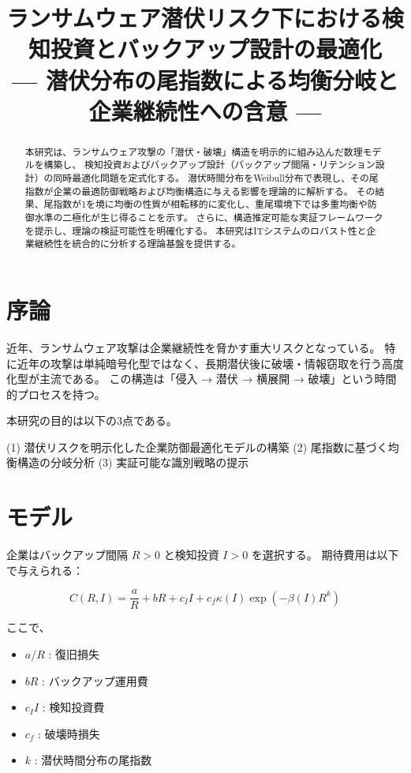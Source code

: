 \documentclass[12pt,a4paper]{article}
\title{ランサムウェア潜伏リスク下における検知投資とバックアップ設計の最適化\\
— 潜伏分布の尾指数による均衡分岐と企業継続性への含意 —}
\author{}
\date{}
\begin{document}
\maketitle

\begin{abstract}
本研究は、ランサムウェア攻撃の「潜伏・破壊」構造を明示的に組み込んだ数理モデルを構築し、
検知投資およびバックアップ設計（バックアップ間隔・リテンション設計）の同時最適化問題を定式化する。
潜伏時間分布をWeibull分布で表現し、その尾指数が企業の最適防御戦略および均衡構造に与える影響を理論的に解析する。
その結果、尾指数が1を境に均衡の性質が相転移的に変化し、重尾環境下では多重均衡や防御水準の二極化が生じ得ることを示す。
さらに、構造推定可能な実証フレームワークを提示し、理論の検証可能性を明確化する。
本研究はITシステムのロバスト性と企業継続性を統合的に分析する理論基盤を提供する。
\end{abstract}

\section{序論}

近年、ランサムウェア攻撃は企業継続性を脅かす重大リスクとなっている。
特に近年の攻撃は単純暗号化型ではなく、長期潜伏後に破壊・情報窃取を行う高度化型が主流である。
この構造は「侵入 → 潜伏 → 横展開 → 破壊」という時間的プロセスを持つ。

本研究の目的は以下の3点である。

(1) 潜伏リスクを明示化した企業防御最適化モデルの構築  
(2) 尾指数に基づく均衡構造の分岐分析  
(3) 実証可能な識別戦略の提示  

\section{モデル}

企業はバックアップ間隔 $R>0$ と検知投資 $I>0$ を選択する。
期待費用は以下で与えられる：

\begin{equation}
C(R,I)
=
\frac{a}{R}
+ bR
+ c_I I
+ c_f \kappa(I)\exp(-\beta(I)R^k)
\end{equation}

ここで、

\begin{itemize}
\item $a/R$ : 復旧損失
\item $bR$ : バックアップ運用費
\item $c_I I$ : 検知投資費
\item $c_f$ : 破壊時損失
\item $k$ : 潜伏時間分布の尾指数
\end{itemize}
\end{document}
